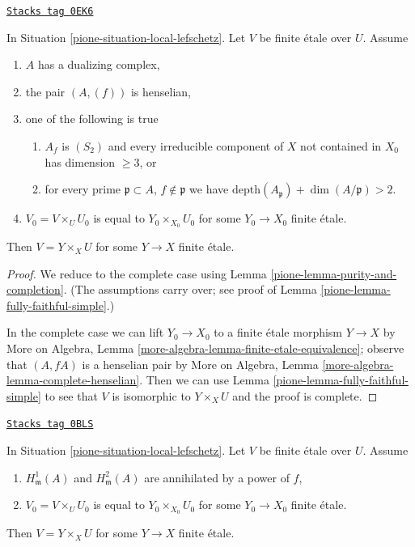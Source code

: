 \begin{lemma}
\label{pione-lemma-lift-simple}
\href{https://stacks.math.columbia.edu/tag/0EK6}{\texttt{Stacks tag 0EK6}}

In Situation \ref{pione-situation-local-lefschetz}. Let $V$ be finite
\'etale over $U$. Assume
\begin{enumerate}
\item[(a)] $A$ has a dualizing complex,
\item[(b)] the pair $(A, (f))$ is henselian,
\item[(c)] one of the following is true
\begin{enumerate}
\item[(i)] $A_f$ is $(S_2)$ and every irreducible component of $X$
not contained in $X_0$ has dimension $\geq 3$, or
\item[(ii)] for every prime $\mathfrak p \subset A$, $f \not \in \mathfrak p$
we have $\text{depth}(A_\mathfrak p) + \dim(A/\mathfrak p) > 2$.
\end{enumerate}
\item[(d)] $V_0 = V \times_U U_0$ is equal to $Y_0 \times_{X_0} U_0$
for some $Y_0 \to X_0$ finite \'etale.
\end{enumerate}
Then $V = Y \times_X U$ for some $Y \to X$ finite \'etale.
\end{lemma}

\begin{proof}

We reduce to the complete case using Lemma \ref{pione-lemma-purity-and-completion}.
(The assumptions carry over; see proof of
Lemma \ref{pione-lemma-fully-faithful-simple}.)

\medskip\noindent
In the complete case we can lift $Y_0 \to X_0$ to a finite \'etale
morphism $Y \to X$ by
More on Algebra, Lemma \ref{more-algebra-lemma-finite-etale-equivalence};
observe that $(A, fA)$ is a henselian pair by
More on Algebra, Lemma \ref{more-algebra-lemma-complete-henselian}.
Then we can use Lemma \ref{pione-lemma-fully-faithful-simple}
to see that $V$ is isomorphic to $Y \times_X U$ and
the proof is complete.
\end{proof}

\begin{lemma}
\label{pione-lemma-lift-purity-general}
\href{https://stacks.math.columbia.edu/tag/0BLS}{\texttt{Stacks tag 0BLS}}

In Situation \ref{pione-situation-local-lefschetz}.
Let $V$ be finite \'etale over $U$. Assume
\begin{enumerate}
\item $H^1_\mathfrak m(A)$ and $H^2_\mathfrak m(A)$
are annihilated by a power of $f$,
\item $V_0 = V \times_U U_0$ is equal to $Y_0 \times_{X_0} U_0$
for some $Y_0 \to X_0$ finite \'etale.
\end{enumerate}
Then $V = Y \times_X U$ for some $Y \to X$ finite \'etale.
\end{lemma}

